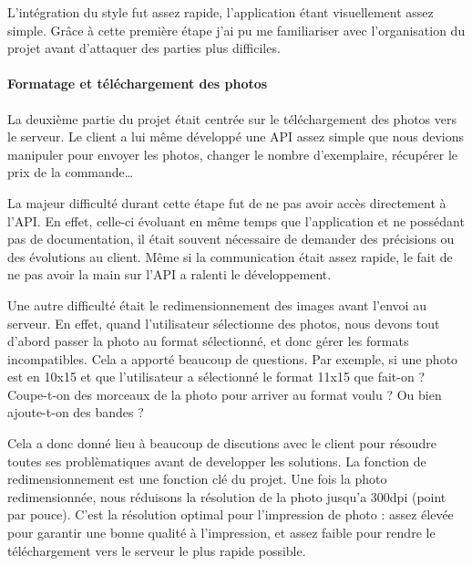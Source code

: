 \bigskip

L'intégration du style fut assez rapide, l'application étant
visuellement assez simple. Grâce à cette première étape j'ai pu me
familiariser avec l'organisation du projet avant d'attaquer des parties
plus difficiles.

\bigskip

\paragraph{Formatage et téléchargement des
photos}\label{formatage-et-tuxe9luxe9chargement-des-photos}

\bigskip

La deuxième partie du projet était centrée sur le téléchargement des
photos vers le serveur. Le client a lui même développé une API assez
simple que nous devions manipuler pour envoyer les photos, changer le
nombre d'exemplaire, récupérer le prix de la commande\ldots{}

\bigskip

La majeur difficulté durant cette étape fut de ne pas avoir accès
directement à l'API. En effet, celle-ci évoluant en même temps que
l'application et ne possédant pas de documentation, il était souvent
nécessaire de demander des précisions ou des évolutions au client. Même
si la communication était assez rapide, le fait de ne pas avoir la main
sur l'API a ralenti le développement.

\bigskip

Une autre difficulté était le redimensionnement des images avant l'envoi
au serveur. En effet, quand l'utilisateur sélectionne des photos, nous
devons tout d'abord passer la photo au format sélectionné, et donc gérer
les formats incompatibles. Cela a apporté beaucoup de questions. Par
exemple, si une photo est en 10x15 et que l'utilisateur a sélectionné le
format 11x15 que fait-on ? Coupe-t-on des morceaux de la photo pour
arriver au format voulu ? Ou bien ajoute-t-on des bandes ?

\bigskip

Cela a donc donné lieu à beaucoup de discutions avec le client pour
résoudre toutes ses problèmatiques avant de developper les solutions. La
fonction de redimensionnement est une fonction clé du projet. Une fois
la photo redimensionnée, nous réduisons la résolution de la photo
jusqu'a 300dpi (point par pouce). C'est la résolution optimal pour
l'impression de photo : assez élevée pour garantir une bonne qualité à
l'impression, et assez faible pour rendre le téléchargement vers le
serveur le plus rapide possible.

